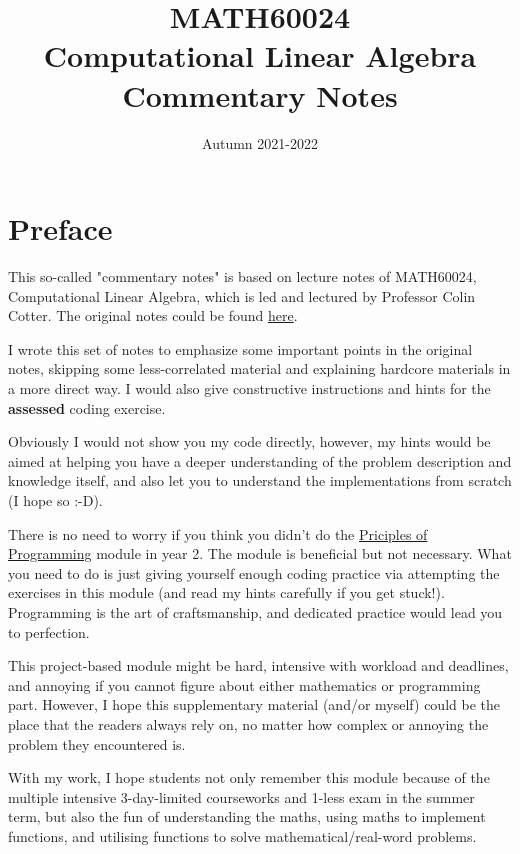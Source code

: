 \documentclass[a4paper,11pt,twoside]{report}
\begin{document}
\title{MATH60024 \\ Computational Linear Algebra \\
Commentary Notes}
\date{Autumn 2021-2022}





\maketitle
\chapter*{Preface}
This so-called "commentary notes" is based on lecture notes of MATH60024, Computational Linear Algebra, which is led and lectured by Professor Colin Cotter. 
The original notes could be found \href{https://comp-lin-alg.github.io}{here}.

I wrote this set of notes to emphasize some important points in the original notes, skipping some less-correlated material and explaining hardcore materials in a more direct way. I would also give constructive instructions and hints for the \textbf{assessed} coding exercise.

Obviously I would not show you my code directly, however, my hints would be aimed at helping you have a deeper understanding of the problem description and knowledge itself, and also let you to understand the implementations from scratch (I hope so :-D).

There is no need to worry if you think you didn't do the \href{https://object-oriented-python.github.io}{Priciples of Programming} module in year 2. The module is beneficial but not necessary. What you need to do is just giving yourself enough coding practice via attempting the exercises in this module (and read my hints carefully if you get stuck!). Programming is the art of craftsmanship, and dedicated practice would lead you to perfection.

This project-based module might be hard, intensive with workload and deadlines, and annoying if you cannot figure about either mathematics or programming part. However, I hope this supplementary material (and/or myself) could be the place that the readers always rely on, no matter how complex or annoying the problem they encountered is.\smallskip

With my work, I hope students not only remember this module because of the multiple intensive 3-day-limited courseworks and 1-less exam in the summer term, but also the fun of understanding the maths, using maths to implement functions, and utilising functions to solve mathematical/real-word problems.
\end{document}
